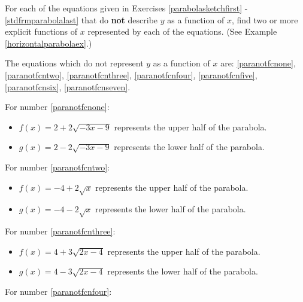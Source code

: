 \documentclass{ximera}
\begin{document}
\begin{problem}
For each of the equations given in Exercises \ref{parabolasketchfirst} - \ref{stdfrmparabolalast} that do \textbf{not} describe $y$ as a function of $x$, find two or more explicit functions of $x$ represented by each of the equations.  (See Example \ref{horizontalparabolaex}.)

\begin{solution}
The equations which do not represent $y$ as a function of $x$ are:  \ref{paranotfcnone}, \ref{paranotfcntwo}, \ref{paranotfcnthree}, \ref{paranotfcnfour}, \ref{paranotfcnfive}, \ref{paranotfcnsix}, \ref{paranotfcnseven}.


For number \ref{paranotfcnone}:

\begin{itemize}

\item  $f(x) = 2+2 \sqrt{-3x-9}$ represents the upper half of the parabola.

\item  $g(x) =  2 - 2\sqrt{-3x-9}$ represents the lower half of the parabola.

\end{itemize}

For number \ref{paranotfcntwo}:

\begin{itemize}

\item  $f(x) = -4+2\sqrt{x}$ represents the upper half of the parabola.

\item  $g(x) =  -4 - 2\sqrt{x}$  represents the lower half of the parabola.

\end{itemize}


For number \ref{paranotfcnthree}:

\begin{itemize}

\item   $f(x) =4+3 \sqrt{2x-4}$ represents the upper half of the parabola.

\item  $g(x) =  4-3 \sqrt{2x-4}$  represents the lower half of the parabola.

\end{itemize}


For number \ref{paranotfcnfour}:

\begin{itemize}


\end{itemize}
\end{solution}
\end{problem}
\end{document}
